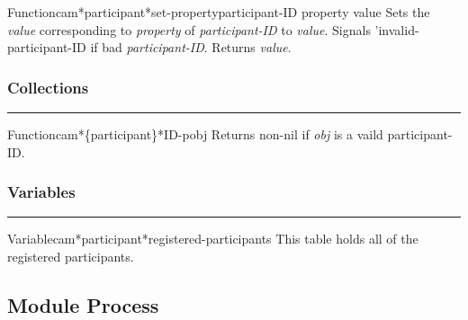 \begin{functiondoc}{Function}{cam*participant*set-property}{participant-ID property value}
Sets the {\em value} corresponding to {\em property} of {\em participant-ID} to {\em value}.
Signals 'invalid-participant-ID if bad {\em participant-ID}.
Returns {\em value}.
\end{functiondoc}


\subsubsection*{Collections}
\par\vspace*{0.00in}\par\hrule\par\medskip\par


\begin{functiondoc}{Function}{cam*\{participant\}*ID-p}{obj}
Returns non-nil if {\em obj} is a vaild participant-ID.
\end{functiondoc}


\subsubsection*{Variables}
\par\vspace*{0.00in}\par\hrule\par\medskip\par


\begin{functiondoc}{Variable}{cam*participant*registered-participants}{}
This table holds all of the registered participants.
\end{functiondoc}


\clearpage

\subsection{Module Process}


